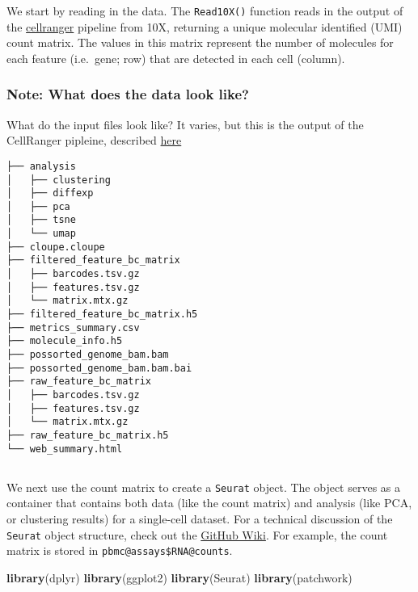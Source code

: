\documentclass[
]{book}
\newenvironment{Shaded}{\begin{snugshade}}{\end{snugshade}}
\newcommand{\FunctionTok}[1]{\textcolor[rgb]{0.13,0.29,0.53}{\textbf{#1}}}
\newcommand{\NormalTok}[1]{#1}
\begin{document}
We start by reading in the data. The \texttt{Read10X()} function reads in the output of the \href{https://support.10xgenomics.com/single-cell-gene-expression/software/pipelines/latest/what-is-cell-ranger}{cellranger} pipeline from 10X, returning a unique molecular identified (UMI) count matrix. The values in this matrix represent the number of molecules for each feature (i.e.~gene; row) that are detected in each cell (column).

\hypertarget{note-what-does-the-data-look-like}{%
\subsubsection*{Note: What does the data look like?}\label{note-what-does-the-data-look-like}}

What do the input files look like? It varies, but this is the output of the CellRanger pipleine, described \href{https://support.10xgenomics.com/single-cell-gene-expression/software/pipelines/latest/output/gex-outputs}{here}

\begin{verbatim}
├── analysis
│   ├── clustering
│   ├── diffexp
│   ├── pca
│   ├── tsne
│   └── umap
├── cloupe.cloupe
├── filtered_feature_bc_matrix
│   ├── barcodes.tsv.gz
│   ├── features.tsv.gz
│   └── matrix.mtx.gz
├── filtered_feature_bc_matrix.h5
├── metrics_summary.csv
├── molecule_info.h5
├── possorted_genome_bam.bam
├── possorted_genome_bam.bam.bai
├── raw_feature_bc_matrix
│   ├── barcodes.tsv.gz
│   ├── features.tsv.gz
│   └── matrix.mtx.gz
├── raw_feature_bc_matrix.h5
└── web_summary.html
\end{verbatim}

\hypertarget{section}{%
\subsection*{}\label{section}}

We next use the count matrix to create a \texttt{Seurat} object. The object serves as a container that contains both data (like the count matrix) and analysis (like PCA, or clustering results) for a single-cell dataset. For a technical discussion of the \texttt{Seurat} object structure, check out the \href{https://github.com/satijalab/seurat/wiki}{GitHub Wiki}. For example, the count matrix is stored in \texttt{pbmc@assays\$RNA@counts}.

\begin{Shaded}
\begin{Highlighting}[]
\FunctionTok{library}\NormalTok{(dplyr)}
\FunctionTok{library}\NormalTok{(ggplot2)}
\FunctionTok{library}\NormalTok{(Seurat)}
\FunctionTok{library}\NormalTok{(patchwork)}
\end{Highlighting}
\end{Shaded}
\end{document}
